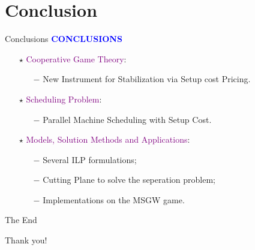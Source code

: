 \documentclass[14pt]{beamer}
\begin{document}
\section{Conclusion}
\begin{frame}{Conclusions}
\centering
\large
\vspace{1mm}
\textcolor{blue}{\bf {\huge C}ONCLUSIONS}
\vspace{2mm}
\begin{itemize}
\normalsize
\justifying
\item[$\star$] \textcolor{purple}{Cooperative Game Theory}:
\begin{itemize}
\small
\vspace{2mm}
\item[$-$] {New Instrument for Stabilization via Setup cost Pricing}.
\vspace{2mm}
\end{itemize}
\item[$\star$] \textcolor{purple}{Scheduling Problem}:
\begin{itemize}
\small
\vspace{2mm}
\item[$-$] Parallel Machine Scheduling with Setup Cost.
\vspace{2mm}
\end{itemize}
\item[$\star$] \textcolor{purple}{Models, Solution Methods and Applications}:
\begin{itemize}
\small
\vspace{2mm}
\item[$-$] Several ILP formulations;
\vspace{2mm}
\item[$-$] Cutting Plane to solve the seperation problem;
\vspace{2mm}
\item[$-$] Implementations on the MSGW game.
\end{itemize}
\end{itemize}
\end{frame}

\begin{frame}{The End}
\begin{center}
	\begin{LARGE}
		Thank you!
	\end{LARGE}
\end{center}
\end{frame}
\end{document}
